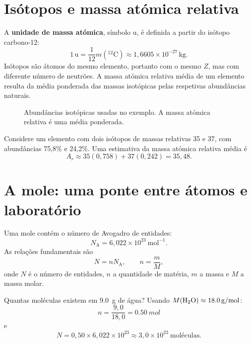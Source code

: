 \documentclass[11pt,a4paper,oneside]{book}
\newcommand{\NA}{N_{\mathrm A}}
\begin{document}
\section{Isótopos e massa atómica relativa}
A \textbf{unidade de massa atómica}, símbolo $\mathrm{u}$, é definida a partir do isótopo carbono-12:
\[
1\,\mathrm{u}=\frac{1}{12}m(^{12}\mathrm{C})\approx1{,}6605\times10^{-27}\,\mathrm{kg}.
\]
Isótopos são átomos do mesmo elemento, portanto com o mesmo $Z$, mas com diferente número de neutrões. A massa atómica relativa média de um elemento resulta da média ponderada das massas isotópicas pelas respetivas abundâncias naturais.

\begin{figure}[H]
\centering
{}
\caption{Abundâncias isotópicas usadas no exemplo. A massa atómica relativa é uma média ponderada.}
\end{figure}

\begin{exemplo}
Considere um elemento com dois isótopos de massas relativas 35 e 37, com abundâncias 75,8\% e 24,2\%. Uma estimativa da massa atómica relativa média é
\[
A_r\approx 35(0{,}758)+37(0{,}242)=35{,}48.
\]
\end{exemplo}

\section{A mole: uma ponte entre átomos e laboratório}
Uma mole contém o número de Avogadro de entidades:
\[
\NA=6{,}022\times10^{23}\ \mathrm{mol^{-1}}.
\]
As relações fundamentais são
\[
N=n\NA,\qquad n=\frac{m}{M},
\]
onde $N$ é o número de entidades, $n$ a quantidade de matéria, $m$ a massa e $M$ a massa molar.

\begin{exemplo}
Quantas moléculas existem em \SI{9.0}{g} de água? Usando $M(\ce{H2O})\approx\SI{18.0}{g/mol}$:
\[
n=\frac{9{,}0}{18{,}0}=\SI{0.50}{mol}
\]
e
\[
N=0{,}50\times6{,}022\times10^{23}\approx3{,}0\times10^{23}\ \text{moléculas}.
\]
\end{exemplo}
\end{document}
